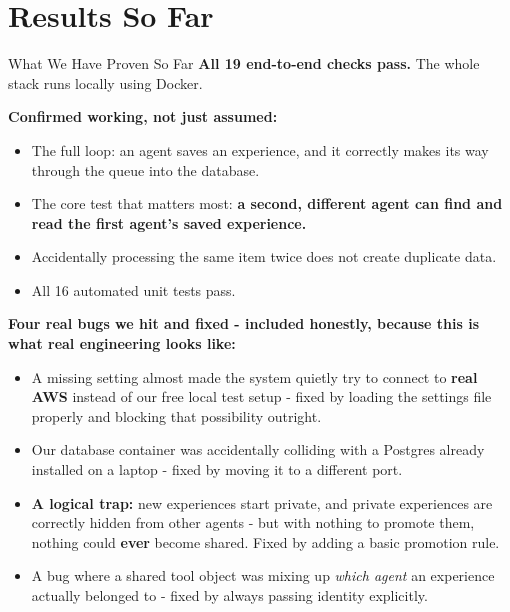 \documentclass{beamer}
\begin{document}
\section{Results So Far}
\begin{frame}{What We Have Proven So Far}
\textbf{All 19 end-to-end checks pass.} The whole stack runs locally using Docker.

\vspace{0.15cm}
\textbf{Confirmed working, not just assumed:}
\begin{itemize}\small
    \item The full loop: an agent saves an experience, and it correctly makes its way through the queue into the database.
    \item The core test that matters most: \textbf{a second, different agent can find and read the first agent's saved experience.}
    \item Accidentally processing the same item twice does not create duplicate data.
    \item All 16 automated unit tests pass.
\end{itemize}

\vspace{0.2cm}
\textbf{Four real bugs we hit and fixed - included honestly, because this is what real engineering looks like:}
\begin{itemize}\footnotesize
    \item A missing setting almost made the system quietly try to connect to \textbf{real AWS} instead of our free local test setup - fixed by loading the settings file properly and blocking that possibility outright.
    \item Our database container was accidentally colliding with a Postgres already installed on a laptop - fixed by moving it to a different port.
    \item \textbf{A logical trap:} new experiences start private, and private experiences are correctly hidden from other agents - but with nothing to promote them, nothing could \textbf{ever} become shared. Fixed by adding a basic promotion rule.
    \item A bug where a shared tool object was mixing up \textit{which agent} an experience actually belonged to - fixed by always passing identity explicitly.
\end{itemize}
\end{frame}
\end{document}
